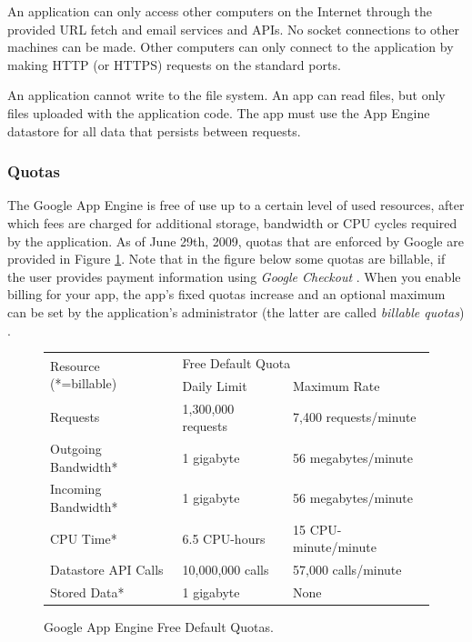 An application can only access other computers on the Internet through the
provided URL fetch and email services and APIs. No socket connections to other
machines can be made. Other computers can only connect to the application by
making HTTP (or HTTPS) requests on the standard ports.

An application cannot write to the file system. An app can read files, but only
files uploaded with the application code. The app must use the App Engine
datastore for all data that persists between requests.

\subsubsection{Quotas}
\label{appengine-quotas}
The Google App Engine is free of use up to a certain level of used resources,
after which fees are charged for additional storage, bandwidth or CPU cycles
required by the application. As of June 29th, 2009, quotas that are enforced by
Google are provided in Figure \ref{quota-table}. Note that in the figure below
some quotas are billable, if the user provides payment information using \emph{Google
Checkout} \cite{google-checkout-www}. When you enable billing for your app, the
app's fixed quotas increase and an optional maximum can be set by the
application's administrator (the latter are called \emph{billable quotas})
\cite{app-engine-quotas}.

\begin{figure}[h,t]
\begin{center}
\begin{tabular}{| l | l | l | }
\hline
\multirow{2}{*}{Resource (*=billable)} & \multicolumn{2}{|l|}{Free Default
Quota} \\
\cline{2-3}
& Daily Limit & Maximum Rate \\
\hline
Requests & 1,300,000 requests & 7,400 requests/minute \\
\hline
Outgoing Bandwidth* & 1 gigabyte & 56 megabytes/minute \\ 
\hline
Incoming Bandwidth* & 1 gigabyte & 56 megabytes/minute \\
\hline
CPU Time* & 6.5 CPU-hours & 15 CPU-minute/minute \\
\hline
Datastore API Calls & 10,000,000 calls & 57,000 calls/minute \\
\hline
Stored Data* & 1 gigabyte & None \\
\hline
\end{tabular}
\caption{Google App Engine Free Default Quotas. \label{quota-table}}
\end{center}
\end{figure}

